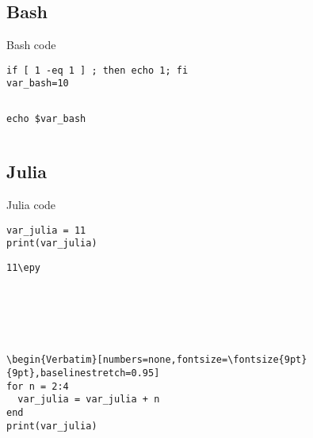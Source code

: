 \documentclass[%
oneside,                 %
final,                   %
chapterprefix=true,      %
open=right,              %
10pt]{book}
\begin{document}
\begin{Verbatim}[numbers=none,fontsize=\fontsize{9pt}{9pt},baselinestretch=0.95]

\end{Verbatim}

\subsection{Bash}
Bash code 




\begin{Verbatim}[numbers=none,fontsize=\fontsize{9pt}{9pt},baselinestretch=0.95]
if [ 1 -eq 1 ] ; then echo 1; fi
var_bash=10

\end{Verbatim}

\begin{Verbatim}[numbers=none,fontsize=\fontsize{9pt}{9pt},baselinestretch=0.95]

\end{Verbatim}



\begin{Verbatim}[numbers=none,fontsize=\fontsize{9pt}{9pt},baselinestretch=0.95]
echo $var_bash

\end{Verbatim}

\begin{Verbatim}[numbers=none,fontsize=\fontsize{9pt}{9pt},baselinestretch=0.95]

\end{Verbatim}

\subsection{Julia}

Julia code




\begin{Verbatim}[numbers=none,fontsize=\fontsize{9pt}{9pt},baselinestretch=0.95]
var_julia = 11
print(var_julia)

\end{Verbatim}

\begin{Verbatim}[numbers=none,fontsize=\fontsize{9pt}{9pt},baselinestretch=0.95]
11\epy






\begin{Verbatim}[numbers=none,fontsize=\fontsize{9pt}{9pt},baselinestretch=0.95]
for n = 2:4
  var_julia = var_julia + n
end
print(var_julia)

\end{Verbatim}
\end{document}
